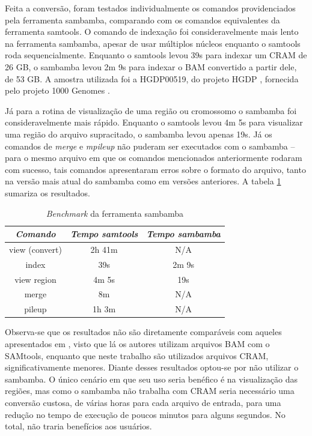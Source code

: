 \documentclass[cic,tc]{iiufrgs}
\begin{document}
Feita a conversão, foram testados individualmente os comandos providenciados
pela ferramenta sambamba, comparando com os comandos equivalentes da ferramenta
samtools. O comando de indexação foi consideravelmente mais lento na ferramenta
sambamba, apesar de usar múltiplos núcleos enquanto o samtools roda
sequencialmente. Enquanto o samtools levou 39s para indexar um CRAM de 26 GB, o
sambamba levou 2m 9s para indexar o BAM convertido a partir dele, de 53 GB. A
amostra utilizada foi a HGDP00519, do projeto HGDP \cite{cavalli2005human},
fornecida pelo projeto 1000 Genomes \cite{via20101000}.

Já para a rotina de visualização de uma região ou cromossomo o sambamba foi
consideravelmente mais rápido. Enquanto o samtools levou 4m 5s para visualizar
uma região do arquivo supracitado, o sambamba levou apenas 19s. Já os comandos
de \textit{merge} e \textit{mpileup} não puderam ser executados com o sambamba
-- para o mesmo arquivo em que os comandos mencionados anteriormente rodaram
com sucesso, tais comandos apresentaram erros sobre o formato do arquivo, tanto
na versão mais atual do sambamba como em versões anteriores. A tabela
\ref{tbl:sambamba} sumariza os resultados.

\begin{table}[h]
  \caption{\textit{Benchmark} da ferramenta sambamba}
    \centering
        \begin{tabular}{c|c|c}
          \hline
          \textit{Comando}  &   \textit{Tempo samtools}  & \textit{Tempo sambamba} \\
          \hline
          \hline
          view (convert) & 2h 41m & N/A \\
          index & 39s & 2m 9s \\
          view region & 4m 5s & 19s \\
          merge & 8m & N/A \\
          pileup & 1h 3m & N/A \\
          \hline
        \end{tabular}
    \label{tbl:sambamba}
\end{table}

Observa-se que os resultados não são diretamente comparáveis com aqueles
apresentados em \cite{tarasov2015sambamba}, visto que lá os autores utilizam
arquivos BAM com o SAMtools, enquanto que neste trabalho são utilizados
arquivos CRAM, significativamente menores. Diante desses resultados optou-se
por não utilizar o sambamba. O único cenário em que seu uso seria benéfico é na
visualização das regiões, mas como o sambamba não trabalha com CRAM seria
necessário uma conversão custosa, de várias horas para cada arquivo de entrada,
para uma redução no tempo de execução de poucos minutos para alguns segundos.
No total, não traria benefícios aos usuários.
\end{document}
